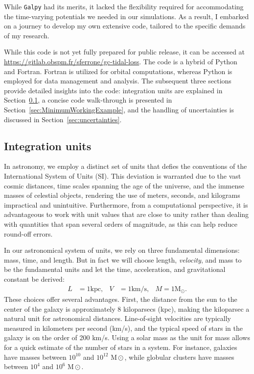 While \texttt{Galpy} had its merits, it lacked the flexibility required for accommodating the time-varying potentials we needed in our simulations. As a result, I embarked on a journey to develop my own extensive code, tailored to the specific demands of my research.


While this code is not yet fully prepared for public release, it can be accessed at \url{https://gitlab.obspm.fr/sferrone/gc-tidal-loss}. The code is a hybrid of Python and Fortran. Fortran is utilized for orbital computations, whereas Python is employed for data management and analysis. The subsequent three sections provide detailed insights into the code: integration units are explained in Section~\ref{sec:integrationUnits}, a concise code walk-through is presented in Section~\ref{sec:MinimumWorkingExample}, and the handling of uncertainties is discussed in Section~\ref{sec:uncertainties}.


\subsection{Integration units}\label{sec:integrationUnits}
In astronomy, we employ a distinct set of units that defies the conventions of the International System of Units (SI). This deviation is warranted due to the vast cosmic distances, time scales spanning the age of the universe, and the immense masses of celestial objects, rendering the use of meters, seconds, and kilograms impractical and unintuitive. Furthermore, from a computational perspective, it is advantageous to work with unit values that are close to unity rather than dealing with quantities that span several orders of magnitude, as this can help reduce round-off errors.


In our astronomical system of units, we rely on three fundamental dimensions: mass, time, and length. But in fact we will choose length, \textit{velocity}, and mass to be the fundamental units and let the time, acceleration, and gravitational constant be derived:
\begin{align}
    L &= 1 \mathrm{kpc},& V&=1\mathrm{km/s},&M=1\mathrm{M}_{\odot}.
\end{align}
These choices offer several advantages. First, the distance from the sun to the center of the galaxy is approximately 8 kiloparsecs (kpc), making the kiloparsec a natural unit for astronomical distances. Line-of-sight velocities are typically measured in kilometers per second (km/s), and the typical speed of stars in the galaxy is on the order of 200 km/s. Using a solar mass as the unit for mass allows for a quick estimate of the number of stars in a system. For instance, galaxies have masses between $10^{10}$ and $10^{12}$ $\mathrm{M}{\odot}$, while globular clusters have masses between $10^{4}$ and $10^{6}$ $\mathrm{M}{\odot}$.

